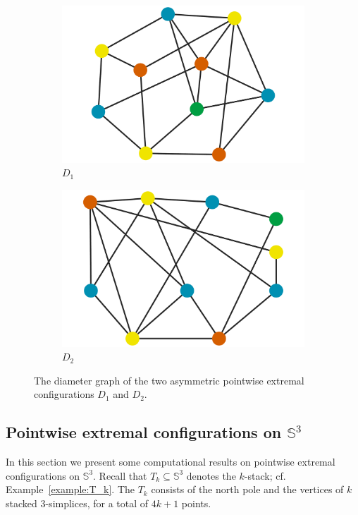 \documentclass[12pt]{amsart}
\theoremstyle{plain}
\newcommand{\Sp}{\mathbb{S}}
\numberwithin{equation}{section}
\begin{document}
\begin{figure}[H]
	\centering
	\begin{subfigure}[b]{0.4\textwidth}
		\centering
		\includegraphics[width = \columnwidth]{./figures/D1_dg.pdf}
		\caption{$D_1$}
	\end{subfigure}
	\hfill
	\begin{subfigure}[b]{0.4\textwidth}
		\centering
		\includegraphics[width = \columnwidth]{./figures/D2_dg.pdf}
		\caption{$D_2$}
	\end{subfigure}
	\caption{The diameter graph of the two asymmetric pointwise extremal configurations $D_1$ and $D_2$.}
	\label{figure:D_diam_graph}
\end{figure}

\subsection{Pointwise extremal configurations on $\Sp^3$}\label{sec:S_3_computation}
In this section we present some computational results on pointwise
extremal configurations on $\Sp^3$.  Recall that $T_k\subseteq\Sp^3$
denotes the $k$-stack; cf. Example~\ref{example:T_k}.  The $T_k$
consists of the north pole and the vertices of $k$ stacked
$3$-simplices, for a total of $4k+1$ points.
\end{document}
